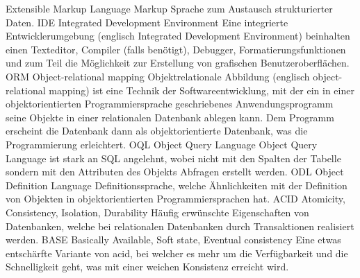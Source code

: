   {Extensible Markup Language}  %
  {Markup Sprache zum Austausch strukturierter Daten.}
  {IDE}               %
  {Integrated Development Environment}  %
  {Eine integrierte Entwicklerumgebung (englisch Integrated Development Environment) beinhalten einen Texteditor, 
Compiler (falls benötigt), Debugger, Formatierungsfunktionen und zum Teil die Möglichkeit zur Erstellung von grafischen 
Benutzeroberflächen.}
  {ORM}               %
  {Object-relational mapping}  %
  {Objektrelationale Abbildung (englisch object-relational mapping) ist eine Technik der Softwareentwicklung, mit der ein in einer 
objektorientierten Programmiersprache geschriebenes Anwendungsprogramm seine Objekte in einer relationalen Datenbank ablegen 
kann. Dem Programm erscheint die Datenbank dann als objektorientierte Datenbank, was die Programmierung erleichtert. 
\cite{wiki_orm}}
  {OQL}               %
  {Object Query Language}  %
  {Object Query Language ist stark an SQL angelehnt, wobei nicht mit den Spalten der Tabelle sondern mit den Attributen des Objekts 
Abfragen erstellt werden.}
  {ODL}               %
  {Object Definition Language}  %
  {Definitionssprache, welche Ähnlichkeiten mit der Definition von Objekten in objektorientierten Programmiersprachen hat.}
  {ACID}               %
  {Atomicity, Consistency, Isolation, Durability}  %
  {Häufig erwünschte Eigenschaften von Datenbanken, welche bei relationalen Datenbanken durch Transaktionen realisiert werden.}
  {BASE}               %
  {Basically Available, Soft state, Eventual consistency}  %
  {Eine etwas entschärfte Variante von \gls{acid}, bei welcher es mehr um die Verfügbarkeit und die Schnelligkeit geht, was mit einer 
weichen Konsistenz erreicht wird.}

